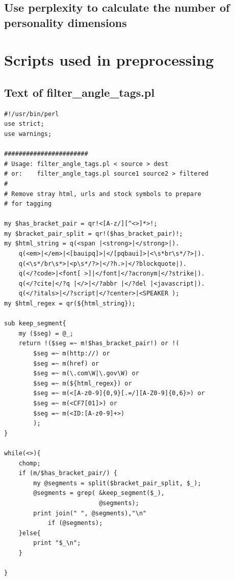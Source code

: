 \documentclass[10pt,letterpaper]{book}
\begin{document}
\section{Use perplexity to calculate the number of personality dimensions}

\appendix
\chapter{Scripts used in preprocessing}
\section{Text of filter\_angle\_tags.pl}
\label{app:filterangletags}
\lstset{language=Perl}
\begin{lstlisting}
#!/usr/bin/perl
use strict;
use warnings;

#######################
# Usage: filter_angle_tags.pl < source > dest
# or:    filter_angle_tags.pl source1 source2 > filtered
#
# Remove stray html, urls and stock symbols to prepare
# for tagging

my $has_bracket_pair = qr!<[A-z/][^<>]*>!;
my $bracket_pair_split = qr!($has_bracket_pair)!;
my $html_string = q(<span |<strong>|</strong>|).
    q(<em>|</em>|<[bauipq]>|</[pqbaui]>|<\s*br\s*/?>|).
    q(<\s*/br\s*>|<p\s*/?>|</?h.>|</?blockquote|).
    q(</?code>|<font[ >]|</font|</?acronym|</?strike|).
    q(</?cite|</?q |</>|</?abbr |</?del |<javascript|).
    q(</?itals>|</?script|</?center>|<SPEAKER );
my $html_regex = qr(${html_string});

sub keep_segment{
    my ($seg) = @_;
    return !($seg =~ m!$has_bracket_pair!) or !(
        $seg =~ m(http://) or
        $seg =~ m(href) or
        $seg =~ m(\.com\W|\.gov\W) or
        $seg =~ m(${html_regex}) or
        $seg =~ m(<[A-z0-9]{0,9}[.=/][A-Z0-9]{0,6}>) or
        $seg =~ m(<CF7[01]>) or
        $seg =~ m(<ID:[A-z0-9]+>)
        );
}

while(<>){
    chomp;
    if (m/$has_bracket_pair/) {
        my @segments = split($bracket_pair_split, $_);
        @segments = grep( &keep_segment($_), 
                          @segments);
        print join(" ", @segments),"\n" 
            if (@segments);
    }else{
        print "$_\n";
    }

}
\end{lstlisting}
\end{document}
